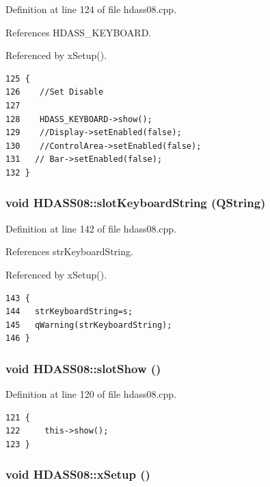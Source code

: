Definition at line 124 of file hdass08.cpp.

References HDASS\_\-KEYBOARD.

Referenced by x\-Setup().



\footnotesize\begin{verbatim}125 {
126    //Set Disable
127   
128    HDASS_KEYBOARD->show();
129    //Display->setEnabled(false);
130    //ControlArea->setEnabled(false);
131   // Bar->setEnabled(false);
132 }
\end{verbatim}\normalsize 
{}
\subsubsection{\setlength{\rightskip}{0pt plus 5cm}void HDASS08::slot\-Keyboard\-String (QString)\hspace{0.3cm}{\tt  [slot]}}\label{classHDASS08_HDASS08i3}




Definition at line 142 of file hdass08.cpp.

References str\-Keyboard\-String.

Referenced by x\-Setup().



\footnotesize\begin{verbatim}143 {
144   strKeyboardString=s;
145   qWarning(strKeyboardString);
146 }
\end{verbatim}\normalsize 
{}
\subsubsection{\setlength{\rightskip}{0pt plus 5cm}void HDASS08::slot\-Show ()\hspace{0.3cm}{\tt  [slot]}}\label{classHDASS08_HDASS08i0}




Definition at line 120 of file hdass08.cpp.



\footnotesize\begin{verbatim}121 {
122     this->show();
123 }
\end{verbatim}\normalsize 
{}
\subsubsection{\setlength{\rightskip}{0pt plus 5cm}void HDASS08::x\-Setup ()}\label{classHDASS08_HDASS08a1}


